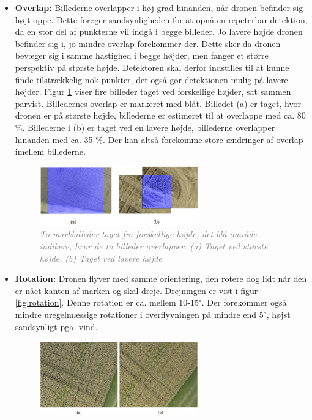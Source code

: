 \begin{itemize}
\item{\textbf{Overlap:} Billederne overlapper i høj grad hinanden, når dronen befinder sig højt oppe. Dette forøger sandsynligheden for at opnå en repeterbar detektion, da en stor del af punkterne vil indgå i begge billeder. Jo lavere højde dronen befinder sig i, jo mindre overlap forekommer der. Dette sker da dronen bevæger sig i samme hastighed i begge højder, men fanger et større perspektiv på største højde. Detektoren skal derfor indstilles til at kunne finde tilstrækkelig nok punkter, der også gør detektionen mulig på lavere højder. Figur \ref{fig:overlap} viser fire billeder taget ved forskellige højder, sat sammen parvist. Billedernes overlap er markeret med blåt. Billedet (a) er taget, hvor dronen er på største højde, billederne er estimeret til at overlappe med ca. 80 $\%$. Billederne i (b) er taget ved en lavere højde, billederne overlapper hinanden med ca. 35 $\%$. Der kan altså forekomme store ændringer af overlap imellem billederne.
\begin{figure}[H]
    \centering
    \includegraphics[width=0.65\textwidth]{fig/17.png}
     \vspace{-1em}
    \begin{center}    
       \caption{\textcolor{gray}{\footnotesize \textit{To markbilleder taget fra forskellige højde, det blå område indikere, hvor de to billeder overlapper. (a) Taget ved største højde. (b) Taget ved lavere højde}}}
    \label{fig:overlap}
     \end{center}
     \vspace{-2.5em}
  \end{figure} \noindent }
\item{\textbf{Rotation:} Dronen flyver med samme orientering, den rotere dog lidt når den er nået kanten af marken og skal dreje. Drejningen er vist i figur \ref{fig:rotation}. Denne rotation er ca. mellem 10-15$^{\circ}$. Der forekommer også mindre uregelmæssige rotationer i overflyvningen på mindre end 5$^{\circ}$, højst sandsynligt pga. vind.
\begin{figure}[H]
    \centering
    \includegraphics[width=0.65\textwidth]{fig/19.png}

\end{figure}}
\end{itemize}
